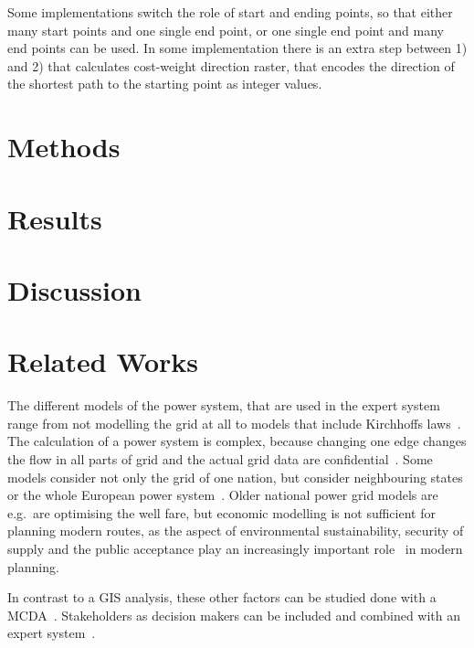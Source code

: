 \documentclass[acmtog]{acmart}
\begin{document}
	Some implementations switch the role of start and ending points, so that either many start points and one single end point, or one single end point and many end points can be used.
	In some implementation there is an extra step between 1) and 2) that calculates cost-weight direction raster, that encodes the direction of the shortest
	path to the starting point as integer values.

	\section{Methods}\label{sec:methods}
	

	\section{Results}\label{sec:results}
	
	
	\section{Discussion}\label{sec:discussion}
	

	\section{Related Works}\label{sec:related-works}

	The different models of the power system, that are used in the expert system range from not modelling the grid at all to models that include Kirchhoffs laws~\cite{bertsch_participatory_2016}.
	The calculation of a power system is complex, because changing one edge changes the flow in all parts of grid and the actual grid data are confidential~\cite{bertsch_participatory_2016}.
	Some models consider not only the grid of one nation, but consider neighbouring states or the whole European power system~\cite{dietrich_will_2010}.	
	Older national power grid models are e.g.\ are optimising the well fare, but economic modelling is not sufficient for planning modern routes, as the aspect of environmental sustainability, security of supply and the public acceptance play an increasingly important role~\cite{hauff_gesellschaftliche_2011} in modern planning.
	
	In contrast to a GIS analysis, these other factors can be studied done with a \acrfull{MCDA}~\cite{bertsch_participatory_2016}.
	Stakeholders as decision makers can be included and combined with an expert system~\cite{bertsch_participatory_2016}.
	
\end{document}
